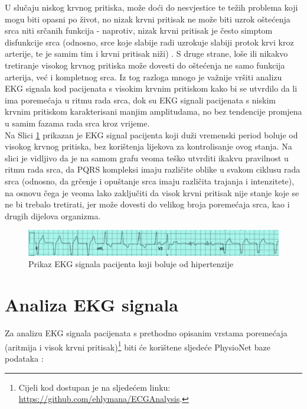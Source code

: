 \documentclass[12pt,a4paper]{article}
\begin{document}
U slučaju niskog krvnog pritiska, može doći do nesvjestice te težih problema koji mogu biti opasni po život, no nizak krvni pritisak ne može biti uzrok oštećenja srca niti srčanih funkcija - naprotiv, nizak krvni pritisak je često simptom disfunkcije srca (odnosno, srce koje slabije radi uzrokuje slabiji protok krvi kroz arterije, te je samim tim i krvni pritisak niži) \cite{low-pressure}. S druge strane, loše ili nikakvo tretiranje visokog krvnog pritiska može dovesti do oštećenja ne samo funkcija arterija, već i kompletnog srca. Iz tog razloga mnogo je važnije vršiti analizu EKG signala kod pacijenata s visokim krvnim pritiskom kako bi se utvrdilo da li ima poremećaja u ritmu rada srca, dok su EKG signali pacijenata s niskim krvnim pritiskom karakterisani manjim amplitudama, no bez tendencije promjena u samim fazama rada srca kroz vrijeme. \cite{high-pressure} \\

Na Slici \ref{s5} prikazan je EKG signal pacijenta koji duži vremenski period boluje od visokog krvnog pritiska, bez korištenja lijekova za kontrolisanje ovog stanja. Na slici je vidljivo da je na samom grafu veoma teško utvrditi ikakvu pravilnost u ritmu rada srca, da PQRS kompleksi imaju različite oblike u svakom ciklusu rada srca (odnosno, da grčenje i opuštanje srca imaju različita trajanja i intenzitete), na osnovu čega je veoma lako zaključiti da visok krvni pritisak nije stanje koje se ne bi trebalo tretirati, jer može dovesti do velikog broja poremećaja srca, kao i drugih dijelova organizma. \cite{pressure-ECG}

\begin{figure}[H]
\center
\includegraphics[scale=0.7]{../res/s5.PNG}
\caption{Prikaz EKG signala pacijenta koji boluje od hipertenzije \cite{pressure-ECG}}
\label{s5}
\end{figure}

\newpage

\section{Analiza EKG signala}

\quad Za analizu EKG signala pacijenata s prethodno opisanim vrstama poremećaja (aritmija i visok krvni pritisak)\footnote{Cijeli kod dostupan je na sljedećem linku: \url{https://github.com/ehlymana/ECGAnalysis}.} biti će korištene sljedeće PhysioNet baze podataka \cite{physionet}:
\end{document}

